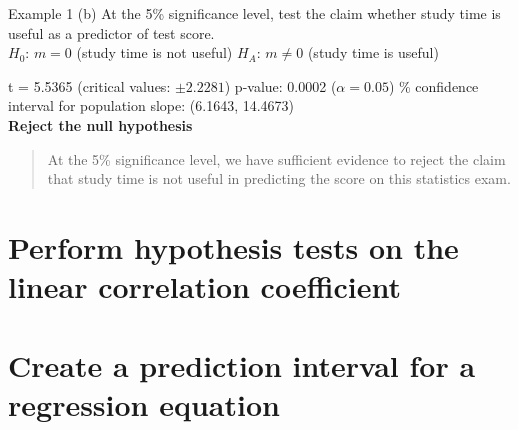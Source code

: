 \documentclass[t]{beamer}
\begin{document}
\begin{frame}{Example 1}
(b) \quad At the 5\% significance level, test the claim whether study time is useful as a predictor of test score.	\newline\\	\pause
$H_0: \, m = 0$ (study time is not useful) \newline \pause
$H_A: \, m \neq 0$ (study time is useful) \newline\\	\pause

t = 5.5365 (critical values: $\pm 2.2281$)	\newline
p-value: 0.0002 ($\alpha = 0.05$) \% confidence interval for population slope: (6.1643, 14.4673)	\newline\\	\pause
\textbf{Reject the null hypothesis} \pause
\begin{quote}
At the 5\% significance level, we have sufficient evidence to reject the claim that study time is not useful in predicting the score on this statistics exam.
\end{quote}
\end{frame}

\section{Perform hypothesis tests on the linear correlation coefficient}

\section{Create a prediction interval for a regression equation}
\end{document}
